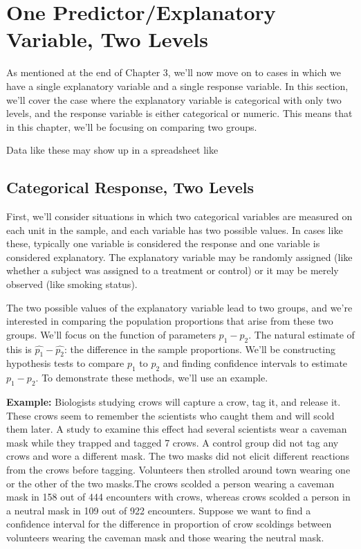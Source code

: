 \documentclass[
  letterpaper,
  DIV=11,
  numbers=noendperiod]{scrartcl}
\author{}
\date{}
\begin{document}
\section{One Predictor/Explanatory Variable, Two
Levels}\label{one-predictorexplanatory-variable-two-levels}

As mentioned at the end of Chapter 3, we'll now move on to cases in
which we have a single explanatory variable and a single response
variable. In this section, we'll cover the case where the explanatory
variable is categorical with only two levels, and the response variable
is either categorical or numeric. This means that in this chapter, we'll
be focusing on comparing two groups.

Data like these may show up in a spreadsheet like

\hfill\break
\hfill\break
\hfill\break
\hfill\break

\subsection{Categorical Response, Two
Levels}\label{categorical-response-two-levels}

First, we'll consider situations in which two categorical variables are
measured on each unit in the sample, and each variable has two possible
values. In cases like these, typically one variable is considered the
response and one variable is considered explanatory. The explanatory
variable may be randomly assigned (like whether a subject was assigned
to a treatment or control) or it may be merely observed (like smoking
status).

\hfill\break
\hfill\break
\hfill\break

The two possible values of the explanatory variable lead to two groups,
and we're interested in comparing the population proportions that arise
from these two groups. We'll focus on the function of parameters
\(p_1 - p_2\). The natural estimate of this is
\(\hat{p_1} - \hat{p_2}\): the difference in the sample proportions.
We'll be constructing hypothesis tests to compare \(p_1\) to \(p_2\) and
finding confidence intervals to estimate \(p_1 - p_2\). To demonstrate
these methods, we'll use an example.

\textbf{Example:} Biologists studying crows will capture a crow, tag it,
and release it. These crows seem to remember the scientists who caught
them and will scold them later. A study to examine this effect had
several scientists wear a caveman mask while they trapped and tagged 7
crows. A control group did not tag any crows and wore a different mask.
The two masks did not elicit different reactions from the crows before
tagging. Volunteers then strolled around town wearing one or the other
of the two masks.The crows scolded a person wearing a caveman mask in
158 out of 444 encounters with crows, whereas crows scolded a person in
a neutral mask in 109 out of 922 encounters. Suppose we want to find a
confidence interval for the difference in proportion of crow scoldings
between volunteers wearing the caveman mask and those wearing the
neutral mask.
\end{document}

